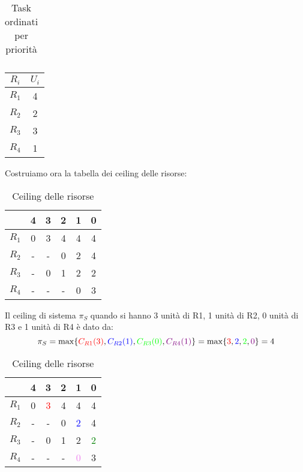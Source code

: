 \begin{Esercizio3}
\begin{table}[H]
\begin{tabular}{|c|c|c|c|c|c|c|}
\hline
\end{tabular}
\caption{Task ordinati per priorità}
\end{table}


\begin{table}[H]
\centering
\begin{tabular}{|c|c|}
\hline
\(R_{i}\) & \(U_{i}\) \\
\hline
\(R_{1}\) & 4 \\
\hline
\(R_{2}\) & 2 \\
\hline
\(R_{3}\) & 3 \\
\hline
\(R_{4}\) & 1 \\
\hline
\end{tabular}
\end{table}


Costruiamo ora la tabella dei ceiling delle risorse:

\begin{table}[H]
\centering  
\begin{tabular}{|c|c|c|c|c|c|}
\hline
& 4 & 3& 2 & 1 & 0\\
\hline
$R_1$ & 0 & 3 & 4 & 4 & 4\\
\hline
$R_2$ & - & - & 0 & 2 & 4\\
\hline
$R_3$ & - & 0 & 1 & 2 & 2\\
\hline
$R_4$ & - & - & - & 0 &  3\\
\hline
\end{tabular}
\caption{Ceiling delle risorse}
\end{table}

Il ceiling di sistema \(\pi_{S}\) quando si hanno 3 unità di R1, 1 unità di R2,
0 unità di R3 e 1 unità di R4 è dato da:
\[\pi_{S} = \max \{ \textcolor{red}{C_{R1}(3)}, 
\textcolor{blue}{C_{R2}(1)}, \textcolor{green}{C_{R3}(0)}, 
\textcolor{violet}{ C_{R4}(1)} \} = \max \{
\textcolor{red}{3}, \textcolor{blue}{2}, \textcolor{green}{2}, \textcolor{violet}{0}\} = 4 \]


\begin{table}[H]
\centering  
\begin{tabular}{|c|c|c|c|c|c|}
\hline
& 4 & 3& 2 & 1 & 0\\
\hline
$R_1$ & 0 & \textcolor{red}{3} & 4 & 4 & 4\\
\hline
$R_2$ & - & - & 0 & \textcolor{blue}{2} & 4\\
\hline
$R_3$ & - & 0 & 1 & 2 & \textcolor{green}{2}\\
\hline
$R_4$ & - & - & - & \textcolor{violet}{0} &  3\\
\hline
\end{tabular}
\caption{Ceiling delle risorse}
\end{table}
\end{Esercizio3}


